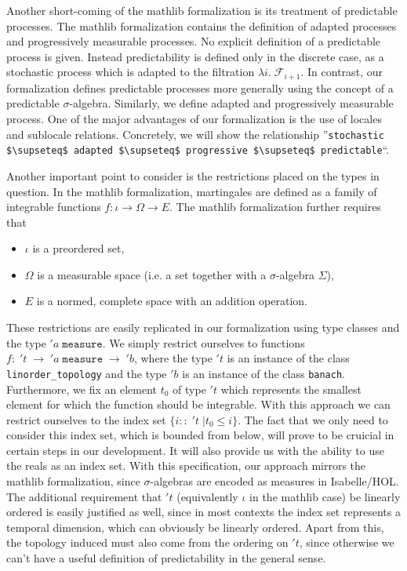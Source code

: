 Another short-coming of the \textsf{mathlib} formalization is its treatment of predictable processes. The \textsf{mathlib} formalization contains the definition of adapted processes and progressively measurable processes. No explicit definition of a predictable process is given. Instead predictability is defined only in the discrete case, as a stochastic process which is adapted to the filtration $\lambda i. \; \mathcal{F}_{i + 1}$. In contrast, our formalization defines predictable processes more generally using the concept of a predictable $\sigma$-algebra. Similarly, we define adapted and progressively measurable process. One of the major advantages of our formalization is the use of locales and sublocale relations. Concretely, we will show the relationship ''\lstinline[mathescape]{stochastic $\supseteq$ adapted $\supseteq$ progressive $\supseteq$ predictable}``.

Another important point to consider is the restrictions placed on the types in question. In the \textsf{mathlib} formalization, martingales are defined as a family of integrable functions $f : \iota \rightarrow \Omega \rightarrow E$. The \textsf{mathlib} formalization further requires that
\begin{itemize}
\item $\iota$ is a preordered set, 
\item $\Omega$ is a measurable space (i.e. a set together with a $\sigma$-algebra $\Sigma$),
\item $E$ is a normed, complete space with an addition operation.
\end{itemize}

These restrictions are easily replicated in our formalization using type classes and the type $'a \;\texttt{measure}$. We simply restrict ourselves to functions $f : \; 't \;\rightarrow \; 'a \;\texttt{measure} \;\rightarrow\; 'b$, where the type $'t$ is an instance of the class \texttt{linorder\_topology} and the type $'b$ is an instance of the class \texttt{banach}. Furthermore, we fix an element $t_0$ of type $'t$ which represents the smallest element for which the function should be integrable. With this approach we can restrict ourselves to the index set $\{i :: \;'t \;\vert t_0 \le i\}$. The fact that we only need to consider this index set, which is bounded from below, will prove to be cruicial in certain steps in our development. It will also provide us with the ability to use the reals as an index set. With this specification, our approach mirrors the \textsf{mathlib} formalization, since $\sigma$-algebras are encoded as measures in Isabelle/HOL. The additional requirement that $'t$ (equivalently $\iota$ in the \textsf{mathlib} case) be linearly ordered is easily justified as well, since in most contexts the index set represents a temporal dimension, which can obviously be linearly ordered. Apart from this, the topology induced must also come from the ordering on $'t$, since otherwise we can't have a useful definition of predictability in the general sense.

